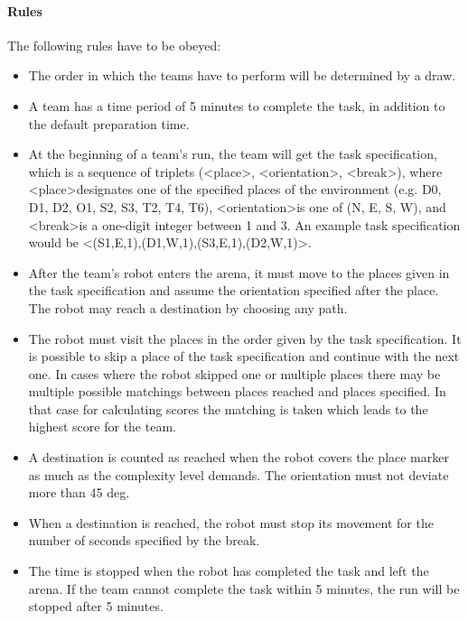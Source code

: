 \paragraph{Rules}
The following rules have to be obeyed:

\begin{itemize}
\item The order in which the teams have to perform will be determined by a draw.
\item A team has a time period of 5 minutes to complete the task, in addition to the default preparation time.
\item At the beginning of a team’s run, the team will get the task specification, which is a sequence of triplets (\textless place\textgreater, \textless orientation\textgreater, \textless break\textgreater), where \textless place\textgreater designates one of the specified places of the environment (e.g. D0, D1, D2, O1, S2, S3, T2, T4, T6), \textless orientation\textgreater is one of (N, E, S, W), and \textless break\textgreater is a one-digit integer between 1 and 3. An example task specification would be \textless (S1,E,1),(D1,W,1),(S3,E,1),(D2,W,1)\textgreater .
\item After the team’s robot enters the arena, it must move to the places given in the task specification and assume the orientation specified after the place. The robot may reach a destination by choosing any path.
\item The robot must visit the places in the order given by the task specification. It is possible to skip a place of the task specification and continue with the next one. In cases where the robot skipped one or multiple places there may be multiple possible matchings between places reached and places specified. In that case for calculating scores the matching is taken which leads to the highest score for the team.
\item A destination is counted as reached when the robot covers the place marker as much as the complexity level demands. The orientation must not deviate more than 45 deg.
\item When a destination is reached, the robot must stop its movement for the number of seconds specified by the break.
\item The time is stopped when the robot has completed the task and left the arena. If the team cannot complete the task within 5 minutes, the run will be stopped after 5 minutes.
\end{itemize}
%
%
%

